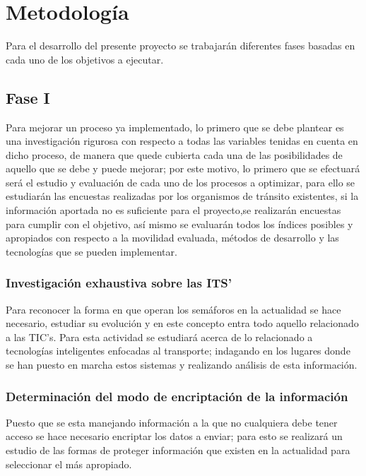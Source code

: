 \chapter{Metodología}

Para el desarrollo del presente proyecto se trabajarán diferentes fases basadas en cada uno de los objetivos a ejecutar.

\section {Fase I}

Para mejorar un proceso ya implementado, lo primero que se debe plantear es una investigación rigurosa con respecto a todas las variables tenidas en cuenta en dicho proceso, de manera que quede cubierta cada una de las posibilidades de aquello que se debe y puede mejorar; por este motivo, lo primero que se efectuará será el estudio y evaluación de cada uno de los procesos a optimizar, para ello se estudiarán las encuestas realizadas por los organismos de tránsito existentes, si la información aportada no es suficiente para el proyecto,se realizarán encuestas para cumplir con el objetivo, así mismo se evaluarán todos los índices posibles y apropiados con respecto a la movilidad evaluada, métodos de desarrollo y las tecnologías que se pueden implementar.
\subsection{Investigación exhaustiva sobre las ITS' }

Para reconocer la forma en que operan los semáforos en la actualidad se hace necesario, estudiar su evolución y en este concepto entra todo aquello relacionado a las TIC's.
Para esta actividad se estudiará acerca de lo relacionado a tecnologías inteligentes enfocadas al transporte; indagando en los lugares donde se han puesto en marcha estos sistemas y realizando análisis de esta información.  

\subsection{Determinación del modo de encriptación de la información}
Puesto que se esta manejando información a la que no cualquiera debe tener acceso se hace necesario encriptar los datos a enviar; para esto se realizará un estudio de las formas de proteger información que existen en la actualidad para seleccionar el más apropiado.

